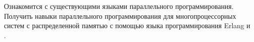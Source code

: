 
Ознакомится с существующими языками параллельного программирования. Получить навыки параллельного программирования для многопроцессорных систем с распределенной памятью с помощью языка программирования Erlang и \gl.

